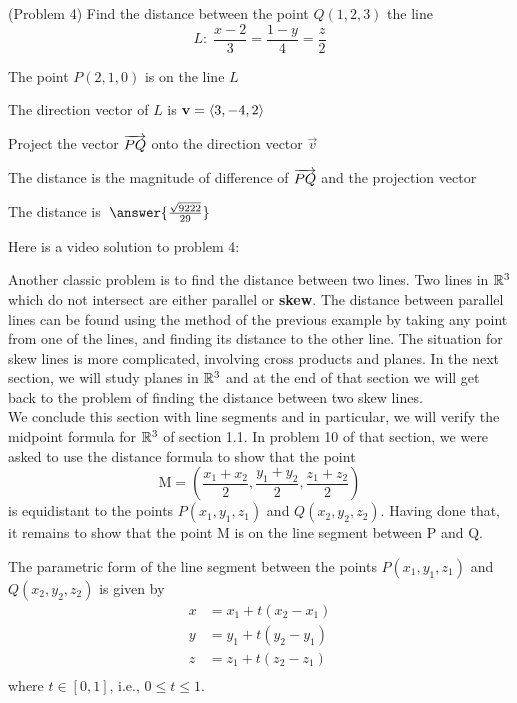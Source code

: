 \documentclass[handout]{ximera}
\begin{document}
\begin{problem}(Problem 4)
Find the distance between the point $Q(1, 2, 3)$ the line 
\[
L: \; \frac{x- 2}{3} = \frac{1-y}{4} = \frac{z}{2}
\]
\begin{hint}
The point $P(2, 1, 0)$ is on the line $L$
\end{hint}
\begin{hint}
The direction vector of $L$ is $\mathbf v = \left\langle 3, -4, 2\right\rangle$
\end{hint}
\begin{hint}
Project the vector $\overrightarrow{PQ}$ onto the direction vector $\vec v$
\end{hint}
\begin{hint}
The distance is the magnitude of difference of $\overrightarrow{PQ}$ and the projection vector
\end{hint}
The distance is $\; \answer{\frac{\sqrt{9222}}{29}}$
\end{problem}

Here is a video solution to problem 4:\\
\begin{foldable}
\end{foldable}

Another classic problem is to find the distance between two lines.
Two lines in $\mathbb R^3$ which do not intersect are either parallel or {\bf skew}.  
The distance between parallel lines can be found using the method of the previous example by 
taking any point from one of the lines,
and finding its distance to the other line.
The situation for skew lines is more complicated, involving cross products and planes.
In the next section, we will study planes in $\mathbb R^3$ and at the end of that section we will get back to the 
problem of finding the distance between two skew lines.\\
We conclude this section with line segments and in particular, we will verify the 
midpoint formula for $\mathbb R^3$ of section 1.1.  In problem 10 of that section, we were asked to use the distance formula to 
show that the point 
\[
\text{M} = \left(\frac{x_1 + x_2}{2}, \frac{y_1 + y_2}{2}, \frac{z_1 + z_2}{2}\right)
\]
is equidistant to the points $P(x_1, y_1, z_1)$ and $Q(x_2, y_2, z_2)$. 
Having done that, it remains to show that the point M is on the line segment between P and Q.

\begin{definition}
The parametric form of the line segment between the points $P(x_1, y_1, z_1)$ and $Q(x_2, y_2, z_2)$
is given by
\begin{align*}
x &= x_1 + t(x_2 - x_1)\\
y &= y_1 + t(y_2 - y_1)\\
z &= z_1 + t(z_2 - z_1)\\
\end{align*}
where $t \in [0,1]$, i.e., $0 \leq t \leq 1$.
\end{definition}
\end{document}
